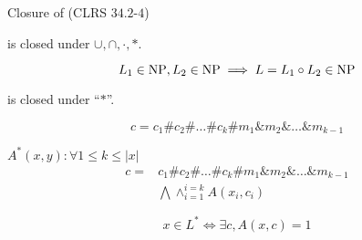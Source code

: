 \begin{frame}
  \begin{exampleblock}{Closure of \np{} (CLRS $34.2$-$4$)}
	\begin{center}
	  \np{} is closed under $\cup, \cap, \cdot, \ast$.
	\end{center}

	\[
	  L_1 \in \text{NP}, L_2 \in \text{NP} \implies L = L_1 \circ L_2 \in \text{NP}
	\]
  \end{exampleblock}
\end{frame}

\begin{frame}
\end{frame}

\begin{frame}
\end{frame}

\begin{frame}
\end{frame}

\begin{frame}
  \begin{theorem}{}
	\np{} is closed under ``$\ast$''.
  \end{theorem}

  \[
	c = c_1\#c_2\#\dots\#c_k\#m_1\&m_2\&\dots\&m_{k-1}
  \]

  $A^{\ast}(x,y): \forall 1 \le k \le |x|$
  \begin{align*}
	c = &c_1\#c_2\#\dots\#c_k\#m_1\&m_2\&\dots\&m_{k-1} \\
	  &\bigwedge \land_{i=1}^{i=k} A(x_i, c_i)
  \end{align*}

  \[
	x \in L^{\ast} \iff \exists c, A(x,c) = 1
  \]
\end{frame}

